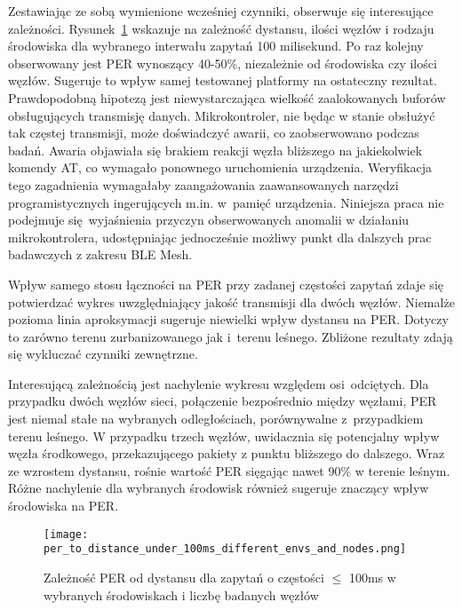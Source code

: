 Zestawiając ze sobą wymienione wcześniej czynniki, obserwuje się interesujące zależności. Rysunek~\ref{rys:per_to_distance_under_100ms_different_envs_and_nodes} wskazuje na zależność dystansu, ilości węzłów i rodzaju
środowiska dla wybranego interwału zapytań 100 milisekund. Po raz kolejny obserwowany jest PER wynoszący
40-50\%, niezależnie od środowiska czy ilości węzłów. Sugeruje to wpływ samej testowanej platformy
na ostateczny rezultat. Prawdopodobną hipotezą jest niewystarczająca wielkość zaalokowanych
buforów obsługujących transmisję danych. Mikrokontroler, nie będąc w stanie obsłużyć tak częstej transmisji,
może doświadczyć awarii, co zaobserwowano podczas badań. Awaria objawiała się brakiem reakcji węzła bliższego
na jakiekolwiek komendy \gls{AT}, co wymagało ponownego uruchomienia urządzenia. Weryfikacja tego zagadnienia
wymagałaby zaangażowania zaawansowanych narzędzi programistycznych ingerujących m.in. w~pamięć urządzenia.
Niniejsza praca nie podejmuje się wyjaśnienia przyczyn obserwowanych anomalii w działaniu mikrokontrolera,
udostępniając jednocześnie możliwy punkt dla dalszych prac badawczych z zakresu BLE Mesh.

Wpływ samego stosu łączności na PER przy zadanej częstości zapytań zdaje się potwierdzać wykres uwzględniający
jakość transmisji dla dwóch węzłów. Niemalże pozioma linia aproksymacji sugeruje niewielki wpływ dystansu na PER.
Dotyczy to zarówno terenu zurbanizowanego jak i~terenu leśnego. Zbliżone rezultaty zdają się wykluczać
czynniki zewnętrzne.

Interesującą zależnością jest nachylenie wykresu względem osi odciętych. Dla przypadku dwóch węzłów sieci,
połączenie bezpośrednio między węzłami, PER jest niemal stałe na wybranych odległościach, porównywalne
z~przypadkiem terenu leśnego. W przypadku trzech
węzłów, uwidacznia się potencjalny wpływ węzła środkowego, przekazującego pakiety z punktu bliższego do
dalszego. Wraz ze wzrostem dystansu, rośnie wartość PER sięgając nawet 90\% w terenie leśnym. Różne nachylenie
dla wybranych środowisk również sugeruje znaczący wpływ środowiska na PER.

\begin{figure}[!htb]
	\centering \texttt{[image: per\_to\_distance\_under\_100ms\_different\_envs\_and\_nodes.png]}
	\caption{Zależność \gls{PER} od dystansu dla zapytań o częstości $\leqslant$ 100ms w wybranych środowiskach i liczbę badanych węzłów}
	\label{rys:per_to_distance_under_100ms_different_envs_and_nodes}
\end{figure}

